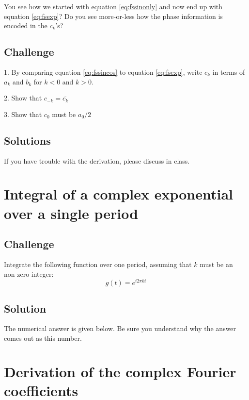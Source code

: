 You see how we started with equation \ref{eq:fssinonly} and now end up with equation \ref{eq:fsexp}? Do you see more-or-less how the phase information is encoded in the $c_k$'s?

\subsection*{Challenge}
1. By comparing equation \ref{eq:fssincos} to equation \ref{eq:fsexp}, write $c_k$ in terms of $a_k$ and $b_k$ for $k<0$ and $k>0$.

2. Show that $c_{-k} = \bar{c_k}$

3. Show that $c_0$ must be $a_0/2$

\subsection*{Solutions}
If you have trouble with the derivation, please discuss in class.




\iffalse
\newpage
\section{Integral of a complex exponential over a single period}

\subsection*{Challenge}
Integrate the following function over one period, assuming that $k$ must be an non-zero integer:
\begin{equation}
    g(t) = e^{i 2 \pi k t}
\end{equation}

\subsection*{Solution}
The numerical answer is given below. Be sure you understand why the answer comes out as this number.





\newpage
\section{Derivation of the complex Fourier coefficients}

